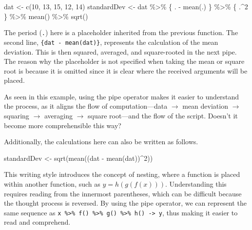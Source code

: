 \documentclass[
  a4paper,
]{book}
\newenvironment{Shaded}{\begin{snugshade}}{\end{snugshade}}
\newcommand{\DecValTok}[1]{\textcolor[rgb]{0.68,0.00,0.00}{#1}}
\newcommand{\FunctionTok}[1]{\textcolor[rgb]{0.28,0.35,0.67}{#1}}
\newcommand{\NormalTok}[1]{\textcolor[rgb]{0.00,0.23,0.31}{#1}}
\newcommand{\OtherTok}[1]{\textcolor[rgb]{0.00,0.23,0.31}{#1}}
\newcommand{\SpecialCharTok}[1]{\textcolor[rgb]{0.37,0.37,0.37}{#1}}
\begin{document}
\begin{Shaded}
\begin{Highlighting}[]
\NormalTok{dat }\OtherTok{\textless{}{-}} \FunctionTok{c}\NormalTok{(}\DecValTok{10}\NormalTok{, }\DecValTok{13}\NormalTok{, }\DecValTok{15}\NormalTok{, }\DecValTok{12}\NormalTok{, }\DecValTok{14}\NormalTok{)}
\NormalTok{standardDev }\OtherTok{\textless{}{-}}\NormalTok{ dat }\SpecialCharTok{\%\textgreater{}\%}
\NormalTok{  \{}
\NormalTok{    . }\SpecialCharTok{{-}} \FunctionTok{mean}\NormalTok{(.)}
\NormalTok{  \} }\SpecialCharTok{\%\textgreater{}\%}
\NormalTok{  \{}
\NormalTok{    .}\SpecialCharTok{\^{}}\DecValTok{2}
\NormalTok{  \} }\SpecialCharTok{\%\textgreater{}\%}
  \FunctionTok{mean}\NormalTok{() }\SpecialCharTok{\%\textgreater{}\%}
  \FunctionTok{sqrt}\NormalTok{()}
\end{Highlighting}
\end{Shaded}

The period (\texttt{.}) here is a placeholder inherited from the
previous function. The second line, \texttt{\{dat\ -\ mean(dat)\}},
represents the calculation of the mean deviation. This is then squared,
averaged, and square-rooted in the next pipe. The reason why the
placeholder is not specified when taking the mean or square root is
because it is omitted since it is clear where the received arguments
will be placed.

As seen in this example, using the pipe operator makes it easier to
understand the process, as it aligns the flow of computation---data
\(\to\) mean deviation \(\to\) squaring \(\to\) averaging \(\to\) square
root---and the flow of the script. Doesn't it become more comprehensible
this way?

Additionally, the calculations here can also be written as follows.

\begin{Shaded}
\begin{Highlighting}[]
\NormalTok{standardDev }\OtherTok{\textless{}{-}} \FunctionTok{sqrt}\NormalTok{(}\FunctionTok{mean}\NormalTok{((dat }\SpecialCharTok{{-}} \FunctionTok{mean}\NormalTok{(dat))}\SpecialCharTok{\^{}}\DecValTok{2}\NormalTok{))}
\end{Highlighting}
\end{Shaded}

This writing style introduces the concept of nesting, where a function
is placed within another function, such as \(y = h(g(f(x)))\).
Understanding this requires reading from the innermost parentheses,
which can be difficult because the thought process is reversed. By using
the pipe operator, we can represent the same sequence as
\texttt{x\ \%\textgreater{}\%\ f()\ \%\textgreater{}\%\ g()\ \%\textgreater{}\%\ h()\ -\textgreater{}\ y},
thus making it easier to read and comprehend.
\end{document}
